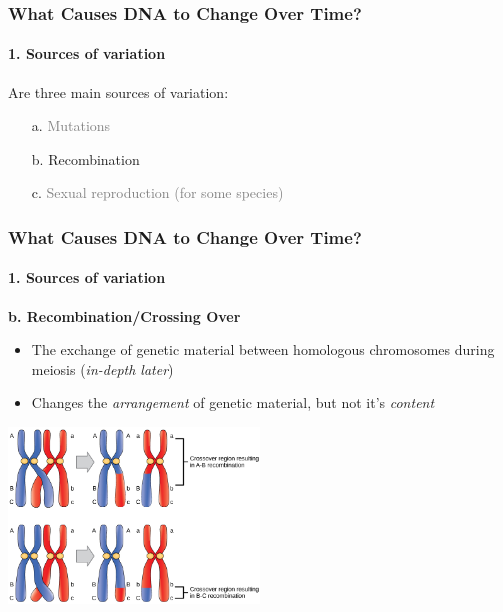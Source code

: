 \documentclass[10pt]{beamer}
\begin{document}
\begin{frame}[t]
\frametitle{What Causes DNA to Change Over Time?}
\framesubtitle{1. Sources of variation}
\vspace{0.5cm}

	Are three main sources of variation:
	\medskip
		\begin{enumerate}
			\item[a.] \textcolor{gray}{Mutations}
			\medskip
			\item[b.] Recombination
			\medskip
			\item[c.] \textcolor{gray}{Sexual reproduction (for some species)}
		\end{enumerate}
\end{frame}


\begin{frame}[t]
\frametitle{What Causes DNA to Change Over Time?}
\framesubtitle{1. Sources of variation}
\vspace{0.5cm}

	\textbf{\textcolor{myblue}{b.} Recombination/Crossing Over}\\
		\medskip
		\begin{itemize}
			\item The exchange of genetic material between homologous chromosomes during meiosis (\textcolor{myblue}{\emph{in-depth later}})
			\medskip
			\item Changes the \emph{arrangement} of genetic material, but not it's \emph{content} 	
		\end{itemize}
		
		\vspace{0.25cm}
		
		\begin{center}
			\includegraphics[width=0.5\textwidth]{figures/crossing_over.jpg}
		\end{center}
\end{frame}
\end{document}
